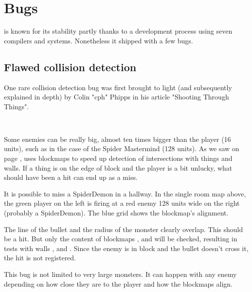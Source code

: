 \section{Bugs}
\doom{} is known for its stability partly thanks to a development process using seven compilers and systems. Nonetheless it shipped with a few bugs.








\subsection{Flawed collision detection}
One rare collision detection bug was first brought to light (and subsequently explained in depth) by Colin "cph" Phipps in his article "Shooting Through Things".\\
\par
{}\\
\par
Some enemies can be really big, almost ten times bigger than the player (16 units), such as in the case of the Spider Mastermind (128 units). As we saw on page \pageref{E1M1_blockmap}, \doom{} uses blockmaps to speed up detection of intersections with things and walls. If a thing is on the edge of block and the player is a bit unlucky, what should have been a hit can end up as a miss.

\vspace{-1cm}


\par
It is possible to miss a SpiderDemon in a hallway. In the single room map above, the green player on the left is firing at a red enemy 128 units wide on the right (probably a SpiderDemon). The blue grid shows the blockmap's alignment.\\
\par
 The line of the bullet and the radius of the monster clearly overlap. This should be a hit. But only the content of blockmaps ,  and  will be checked, resulting in tests with walls ,  and . Since the enemy is in block  and the bullet doesn't cross it, the hit is not registered.\\
 \par
 This bug is not limited to very large monsters. It can happen with any enemy depending on how close they are to the player and how the blockmaps align.







